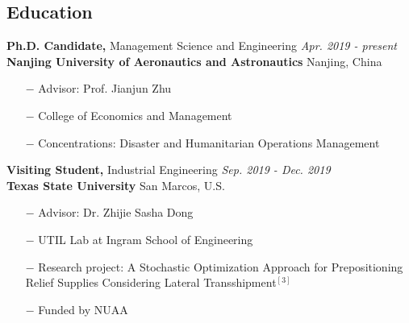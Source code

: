 \documentclass[margin]{res}
\begin{document}
 


\address{\\ [5pt]
Nanjing University of Aeronautics and Astronautics (NUAA) \\
29 Jiangjun Avenue  \\
Nanjing Jiangsu, 211106 China}
\address{\small \it
\hfill Updated: \today \\ [5pt]
Email: \hfill m@guo.ph \\
Homepage: \hfill \href{https://guo.ph}{https://guo.ph} \\[5pt]
}


\begin{resume} 


\vspace{-.8em}
\section{\sc Education}


{\bf Ph.D. Candidate,}  Management Science and Engineering \hfill {\it Apr. 2019 - present}\\
{\bf Nanjing University of Aeronautics and Astronautics} \hfill Nanjing, China
\begin{itemize}  \itemsep -2pt  %
\item[\(-\)] Advisor: Prof. Jianjun Zhu
\item[\(-\)] College of Economics and Management
\item[\(-\)] Concentrations: Disaster and Humanitarian Operations Management
\end{itemize}
\vspace{-.8em}


{\bf Visiting Student,} Industrial Engineering \hfill {\it Sep. 2019 - Dec. 2019}\\
{\bf Texas State University} \hfill San Marcos, U.S.
\begin{itemize}   \itemsep -2pt  %
\item[\(-\)] Advisor: Dr. Zhijie Sasha Dong
\item[\(-\)] UTIL Lab at Ingram School of Engineering
\item[\(-\)] Research project: A Stochastic Optimization Approach for Prepositioning Relief Supplies Considering Lateral Transshipment\(^{[3]}\)
\item[\(-\)] Funded by NUAA
\end{itemize}
\vspace{-.8em}


\end{resume}
\end{document}
